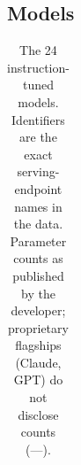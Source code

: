 \documentclass[
]{article}
\begin{document}
\subsection{Models}\label{models}

{

\begin{longtable}[]{@{}
  >{\raggedright\arraybackslash}p{}
  >{\raggedright\arraybackslash}p{}
  >{\raggedright\arraybackslash}p{}
  >{\raggedleft\arraybackslash}p{}
  >{\raggedright\arraybackslash}p{}
  >{\raggedright\arraybackslash}p{}
  >{\raggedright\arraybackslash}p{}
  >{\raggedright\arraybackslash}p{}
  >{\raggedright\arraybackslash}p{}@{}}

\caption{\label{tbl-models}The 24 instruction-tuned models. Identifiers
are the exact serving-endpoint names in the data. Parameter counts as
published by the developer; proprietary flagships (Claude, GPT) do not
disclose counts (---).}

\tabularnewline


\end{longtable}}
\end{document}
